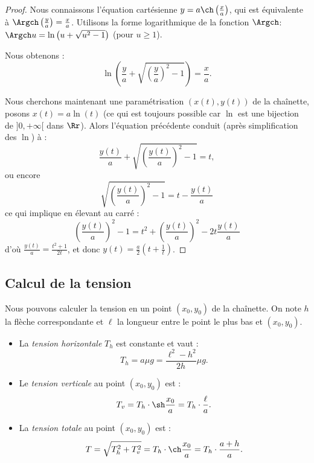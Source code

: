 \documentclass[class=report,crop=false]{standalone}
\begin{document}
\begin{proof}
Nous connaissons l'équation cartésienne $y=a\ch \left(\frac x a\right)$,
qui est équivalente à $\Argch\left(\frac y a\right) = \frac x a$.
Utilisons la forme logarithmique de la fonction $\Argch$: 
$\Argch u = \ln \left( u + \sqrt{u^2-1} \right)$ (pour $u \ge 1$).

Nous obtenons :
$$\ln \left( \frac y a + \sqrt{\left(\frac y a\right)^2-1} \right) = \frac x a.$$

Nous cherchons maintenant une paramétrisation $(x(t),y(t))$ de la chaînette, 
posons $x(t) = a \ln(t)$ (ce qui est toujours possible car $\ln$ 
est une bijection de $]0,+\infty[$ dans $\Rr$).
Alors l'équation précédente conduit (après simplification des $\ln$) à :
$$\frac{y(t)}{a} + \sqrt{\left(\frac{y(t)}{a}\right)^2-1} = t,$$
ou encore 
$$\sqrt{\left(\frac{y(t)}{a}\right)^2-1} = t - \frac{y(t)}{a}$$
ce qui implique en élevant au carré :
$${\left(\frac{y(t)}{a}\right)^2-1} = t^2 + \left(\frac{y(t)}{a}\right)^2- 2t\frac{y(t)}{a}$$
d'où $\frac{y(t)}{a} = \frac{t^2+1}{2t}$,
et donc $y(t) = \frac a2 \left(t+\frac 1 t\right)$.
\end{proof}


\subsection{Calcul de la tension}

\begin{proposition}
\label{prop:tens}
Nous pouvons calculer la tension en un point $(x_0,y_0)$ de la chaînette.
On note $h$ la flèche correspondante et $\ell$ la longueur entre le point le plus bas et $(x_0,y_0)$.
\shorthandoff{:}
\shorthandon{:}
\begin{itemize}
  \item La \emph{tension horizontale} $T_h$ est constante et vaut :
  $$T_h = a \mu g = \frac{\ell^2-h^2}{2h} \mu g.$$
  
  \item Le \emph{tension verticale} au point $(x_0,y_0)$ est : $$T_v= T_h \cdot \sh \frac{x_0}{a} = T_h \cdot \frac \ell a.$$
  
  \item La \emph{tension totale} au point $(x_0,y_0)$ est :
  $$T = \sqrt{T_h^2+T_v^2} = T_h \cdot \ch \frac{x_0}{a} = T_h \cdot \frac{a+h}{a}.$$
\end{itemize}
\end{proposition}
\end{document}
